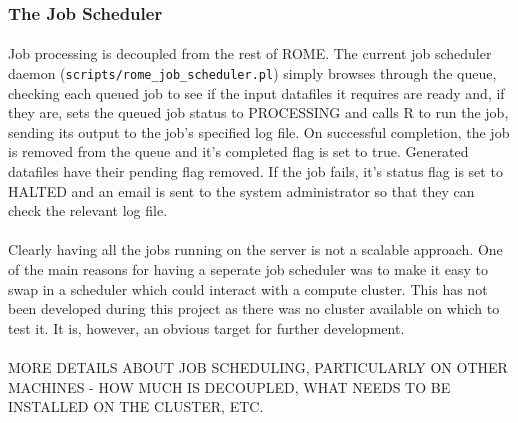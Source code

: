 \subsubsection{The Job Scheduler}
\label{sec:job_scheduling}
\paragraph{}
Job processing is decoupled from the rest of ROME. The current job scheduler daemon (\texttt{scripts/rome\_job\_scheduler.pl}) simply browses through the queue, checking each queued job to see if the input datafiles it requires are ready and, if they are, sets the queued job status to PROCESSING and calls R to run the job, sending its output to the job's specified log file. On successful completion, the job is removed from the queue and it's completed flag is set to true. Generated datafiles have their pending flag removed. If the job fails, it's status flag is set to HALTED and an email is sent to the system administrator so that they can check the relevant log file.

\paragraph{}
Clearly having all the jobs running on the server is not a scalable approach. One of the main reasons for having a seperate job scheduler was to make it easy to swap in a scheduler which could interact with a compute cluster. This has not been developed during this project as there was no cluster available on which to test it. It is, however, an obvious target for further development.

\paragraph{}
MORE DETAILS ABOUT JOB SCHEDULING, PARTICULARLY ON OTHER MACHINES - HOW MUCH IS DECOUPLED, WHAT NEEDS TO BE INSTALLED ON THE CLUSTER, ETC.


